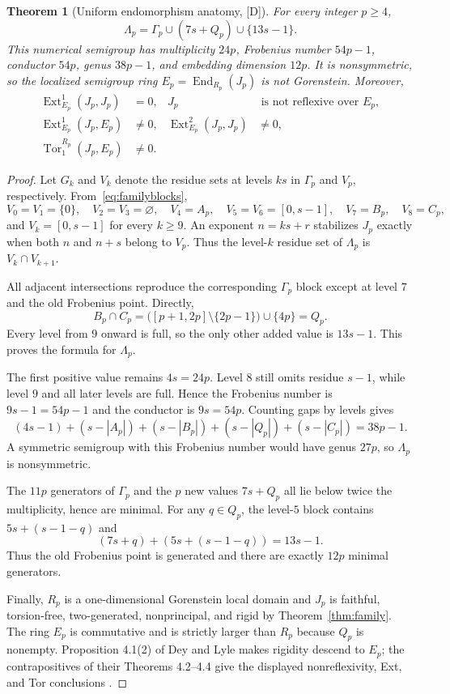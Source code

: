 \documentclass[11pt]{article}
\newtheorem{theorem}{Theorem}[section]
\theoremstyle{definition}
\theoremstyle{remark}
\begin{document}
\begin{theorem}[Uniform endomorphism anatomy, {[D]}]\label{thm:endomorphism}
For every integer $p\ge4$,
\[
\Lambda_p=\Gamma_p\cup(7s+Q_p)\cup\{13s-1\}.
\]
This numerical semigroup has multiplicity $24p$, Frobenius number $54p-1$, conductor $54p$,
genus $38p-1$, and embedding dimension $12p$. It is nonsymmetric, so the localized semigroup ring
$E_p=\operatorname{End}_{R_p}(J_p)$ is not Gorenstein. Moreover,
\begin{align*}
\operatorname{Ext}^1_{E_p}(J_p,J_p)&=0,
&J_p&\text{ is not reflexive over }E_p,\\
\operatorname{Ext}^1_{E_p}(J_p,E_p)&\ne0,
&\operatorname{Ext}^2_{E_p}(J_p,J_p)&\ne0,\\
\operatorname{Tor}^{R_p}_1(J_p,E_p)&\ne0.&&
\end{align*}
\end{theorem}
\begin{proof}
Let $G_k$ and $V_k$ denote the residue sets at levels $ks$ in $\Gamma_p$ and $V_p$,
respectively. From~\eqref{eq:familyblocks},
\[
V_0=V_1=\{0\},\quad V_2=V_3=\varnothing,\quad
V_4=A_p,\quad V_5=V_6=[0,s-1],\quad V_7=B_p,\quad V_8=C_p,
\]
and $V_k=[0,s-1]$ for every $k\ge9$. An exponent $n=ks+r$ stabilizes $J_p$ exactly when both
$n$ and $n+s$ belong to $V_p$. Thus the level-$k$ residue set of $\Lambda_p$ is
$V_k\cap V_{k+1}$.

All adjacent intersections reproduce the corresponding $\Gamma_p$ block except at level $7$ and
the old Frobenius point. Directly,
\[
B_p\cap C_p
=\bigl([p+1,2p]\setminus\{2p-1\}\bigr)\cup\{4p\}
=Q_p.
\]
Every level from $9$ onward is full, so the only other added value is $13s-1$. This proves the
formula for $\Lambda_p$.

The first positive value remains $4s=24p$. Level $8$ still omits residue $s-1$, while level $9$
and all later levels are full. Hence the Frobenius number is $9s-1=54p-1$ and the conductor is
$9s=54p$. Counting gaps by levels gives
\[
(4s-1)+(s-|A_p|)+(s-|B_p|)+(s-|Q_p|)+(s-|C_p|)=38p-1.
\]
A symmetric semigroup with this Frobenius number would have genus $27p$, so $\Lambda_p$ is
nonsymmetric.

The $11p$ generators of $\Gamma_p$ and the $p$ new values $7s+Q_p$ all lie below twice the
multiplicity, hence are minimal. For any $q\in Q_p$, the level-$5$ block contains
$5s+(s-1-q)$ and
\[
(7s+q)+(5s+(s-1-q))=13s-1.
\]
Thus the old Frobenius point is generated and there are exactly $12p$ minimal generators.

Finally, $R_p$ is a one-dimensional Gorenstein local domain and $J_p$ is faithful, torsion-free,
two-generated, nonprincipal, and rigid by Theorem~\ref{thm:family}. The ring $E_p$ is commutative
and is strictly larger than $R_p$ because $Q_p$ is nonempty. Proposition 4.1(2) of Dey and Lyle
makes rigidity descend to $E_p$; the contrapositives of their Theorems 4.2--4.4 give the displayed
nonreflexivity, Ext, and Tor conclusions \cite{DeyLyle2025}.
\end{proof}
\end{document}
